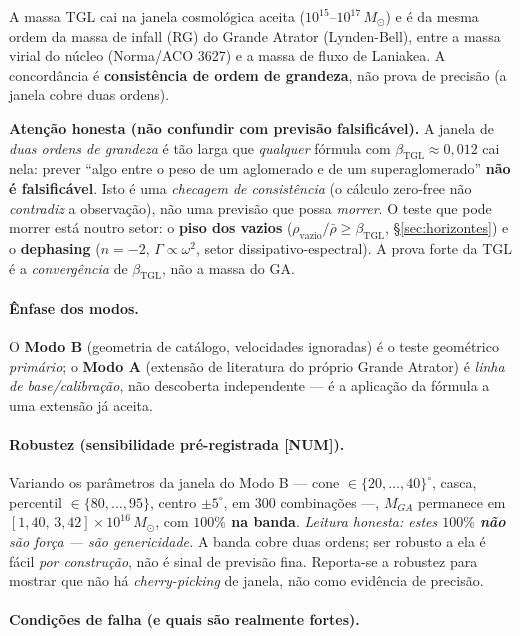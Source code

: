 \documentclass[11pt]{article}
\newcommand{\bTGL}{\beta_{\mathrm{TGL}}}\newcommand{\Msun}{M_{\odot}}\newcommand{\TGL}{\mathrm{TGL}}
\theoremstyle{definition}\newtheorem{deriv}{Derivação}
\begin{document}
A massa TGL cai na janela cosmológica aceita ($10^{15}$--$10^{17}\,\Msun$) e é da mesma ordem da massa de infall (RG) do Grande Atrator (Lynden-Bell), entre a massa virial do núcleo (Norma/ACO 3627) e a massa de fluxo de Laniakea. A concordância é \textbf{consistência de ordem de grandeza}, não prova de precisão (a janela cobre duas ordens).

\textbf{Atenção honesta (não confundir com previsão falsificável).} A janela de \emph{duas ordens de grandeza} é tão larga que \emph{qualquer} fórmula com $\bTGL\approx0{,}012$ cai nela: prever ``algo entre o peso de um aglomerado e de um superaglomerado'' \textbf{não é falsificável}. Isto é uma \emph{checagem de consistência} (o cálculo zero-free não \emph{contradiz} a observação), não uma previsão que possa \emph{morrer}. O teste que pode morrer está noutro setor: o \textbf{piso dos vazios} ($\rho_{\mathrm{vazio}}/\bar\rho\geq\bTGL$, \S\ref{sec:horizontes}) e o \textbf{dephasing} ($n=-2$, $\Gamma\propto\omega^2$, setor dissipativo-espectral). A prova forte da TGL é a \emph{convergência} de $\bTGL$, não a massa do GA.

\paragraph{Ênfase dos modos.} O \textbf{Modo B} (geometria de catálogo, velocidades ignoradas) é o teste geométrico \emph{primário}; o \textbf{Modo A} (extensão de literatura do próprio Grande Atrator) é \emph{linha de base/calibração}, não descoberta independente --- é a aplicação da fórmula a uma extensão já aceita.

\paragraph{Robustez (sensibilidade pré-registrada \textsf{[NUM]}).} Variando os parâmetros da janela do Modo B --- cone $\in\{20,\dots,40\}^\circ$, casca, percentil $\in\{80,\dots,95\}$, centro $\pm5^\circ$, em $300$ combinações ---, $M_{GA}$ permanece em $[1{,}40,\,3{,}42]\times10^{16}\,\Msun$, com \textbf{$100\%$ na banda}. \emph{Leitura honesta: estes $100\%$ \textbf{não} são força --- são genericidade.} A banda cobre duas ordens; ser robusto a ela é fácil \emph{por construção}, não é sinal de previsão fina. Reporta-se a robustez para mostrar que não há \emph{cherry-picking} de janela, não como evidência de precisão.

\paragraph{Condições de falha (e quais são realmente fortes).}
\end{document}
